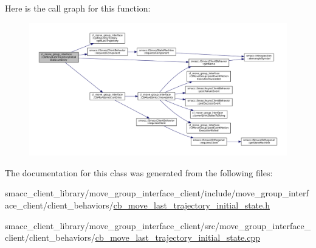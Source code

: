 Here is the call graph for this function\+:
\nopagebreak
\begin{figure}[H]
\begin{center}
\leavevmode
\includegraphics[width=350pt]{classcl__move__group__interface_1_1CbMoveLastTrajectoryInitialState_ad51f4883ea1f7442875cda06c3d474c3_cgraph}
\end{center}
\end{figure}


The documentation for this class was generated from the following files\+:\begin{DoxyCompactItemize}
\item 
smacc\+\_\+client\+\_\+library/move\+\_\+group\+\_\+interface\+\_\+client/include/move\+\_\+group\+\_\+interface\+\_\+client/client\+\_\+behaviors/\hyperlink{cb__move__last__trajectory__initial__state_8h}{cb\+\_\+move\+\_\+last\+\_\+trajectory\+\_\+initial\+\_\+state.\+h}\item 
smacc\+\_\+client\+\_\+library/move\+\_\+group\+\_\+interface\+\_\+client/src/move\+\_\+group\+\_\+interface\+\_\+client/client\+\_\+behaviors/\hyperlink{cb__move__last__trajectory__initial__state_8cpp}{cb\+\_\+move\+\_\+last\+\_\+trajectory\+\_\+initial\+\_\+state.\+cpp}\end{DoxyCompactItemize}
